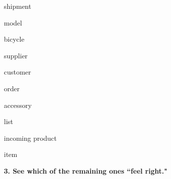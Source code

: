 \vspace{-.3in}
\begin{samepage}
\begin{center}
\parbox{.8\textwidth}{
\begin{multicols}{2}
\begin{compactitem}
\item shipment
\item model
\item bicycle
\item supplier
\item customer
\columnbreak
\item order
\item accessory
\item list
\item incoming product
\item item
\end{compactitem}
\end{multicols}
}
\end{center}
\end{samepage}

\textbf{3. See which of the remaining ones ``feel right."}


